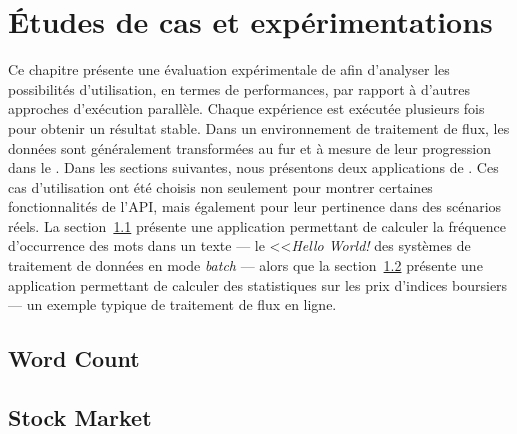 
\chapter{\'Etudes de cas et exp\'erimentations}
\label{experiences.chap}

Ce chapitre pr\'esente une \'evaluation exp\'erimentale de  afin d'analyser les possibilit\'es d'utilisation, en termes de performances, par rapport \`a d'autres approches d'ex\'ecution parall\`ele. Chaque exp\'erience est ex\'ecut\'ee plusieurs fois pour obtenir un r\'esultat stable. Dans un environnement de traitement de flux, les donn\'ees sont g\'en\'eralement transform\'ees au fur et \`a mesure de leur progression dans le . Dans les sections suivantes, nous pr\'esentons deux applications de . Ces cas d'utilisation ont \'et\'e choisis non seulement pour montrer certaines fonctionnalit\'es de l'API, mais \'egalement pour leur pertinence dans des sc\'enarios r\'eels. La section~\ref{wordcount.sect} pr\'esente une application permettant de calculer la fr\'equence d'occurrence des mots dans un texte --- le <<\emph{Hello World!} des syst\`emes de traitement de donn\'ees en mode \emph{batch} --- alors que la section~\ref{stockprice.sect} pr\'esente une application permettant de calculer des statistiques sur les prix d'indices boursiers --- un exemple typique de traitement de flux en ligne.


\section{Word Count}
\label{wordcount.sect}


\section{Stock Market}
\label{stockprice.sect}
